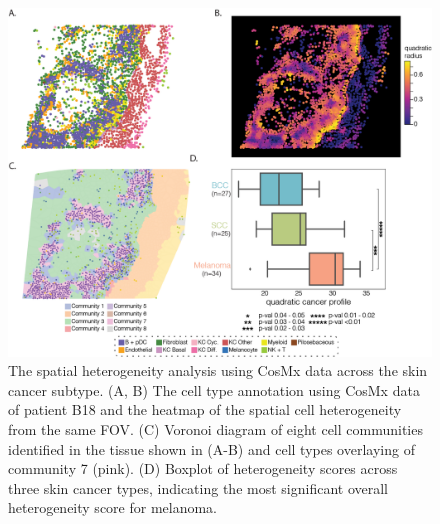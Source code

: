 \begin{figure}
    \centering
    \includegraphics[width=0.8\columnwidth]{Chapter4/Figures/Chap4_figure_2.png}
    \caption[The spatial heterogeneity analysis using CosMx data across the skin cancer subtype]{The spatial heterogeneity analysis using CosMx data across the skin cancer subtype. (A, B) The cell type annotation using CosMx data of patient B18 and the heatmap of the spatial cell heterogeneity from the same FOV. (C) Voronoi diagram of eight cell communities identified in the tissue shown in (A-B) and cell types overlaying of community 7 (pink). (D) Boxplot of heterogeneity scores across three skin cancer types, indicating the most significant overall heterogeneity score for melanoma.}
    \label{Chap4:fig1}
    
\end{figure}

